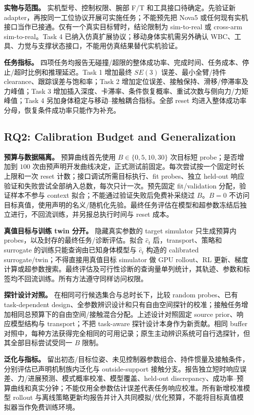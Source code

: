 \documentclass[11pt]{article}
\begin{document}
\textbf{实物与范围。} 实机型号、控制权限、腕部 F/T 和工具接口待确定。先验证新 adapter，再按同一工位协议开展可实施任务；不能预先把 Nova5 或任何现有实机接口当作已接通。仅有一个真实目标臂时，结论限制为 sim-to-real 或 cross-arm sim-to-real。Task 4 已纳入仿真扩展协议；移动身体实机需另外确认 WBC、工具、力觉与支撑状态接口，不能用仿真结果替代实机验证。

\textbf{任务指标。} 四项任务均报告无碰撞/超限的整体成功率、完成时间、任务成本、停止/超时比例和推理延迟。Task 1 增加最终 $SE(3)$ 误差、最小全臂/持件 clearance、跟踪误差与饱和率；Task 2 增加定位误差、接触保持、滑移/停滞率及力峰值；Task 3 增加插入深度、卡滞率、条件恢复概率、重试次数与侧向力/力矩峰值；Task 4 另加身体稳定与移动--接触耦合指标。全部 reset 均进入整体成功率分母，恢复条件成功率只能作为补充。

\subsection{RQ2: Calibration Budget and Generalization}
\textbf{预算与数据隔离。} 预算曲线首先使用 $B\in\{0,5,10,30\}$ 次目标短 probe；是否增加到 $100$ 次由预声明开发曲线决定，正式测试前固定。每次尝试按一个固定时长上限和一次 reset 计数；接口调试所需目标执行、fit probes、独立 held-out 响应验证和失败尝试全部纳入总数，每次只计一次。预先固定 fit/validation 分配，验证样本不参与 context 拟合；不能通过验证失败后免费补采绕过 $B$。$B=0$ 不访问目标真值，使用声明的名义/随机化先验。最终任务评估在模型和超参数冻结后独立进行，不回流训练，并另报总执行时间与 reset 成本。

\textbf{真值目标与训练 twin 分开。} 隐藏真实参数的 target simulator 只生成预算内 probes，以及封存的最终任务/诊断评估。拟合 $\hat c_t$ 后，transport、策略和 surrogate 的训练只能查询由已知身体模型与 $\hat c_t$ 构造的 calibrated surrogate/twin；不得直接用真值目标 simulator 做 GPU rollout、RL 更新、梯度计算或超参数搜索。最终评估及可行性诊断的查询量单列统计，其轨迹、参数和标签均不回流训练。所有方法遵守同样访问权限。

\textbf{探针设计对照。} 在相同可行候选集合与总时长下，比较 random probes、已有 task-dependent design、全参数辨识设计和只有自由空间探针的校准；接触任务增加相同总预算下的自由空间/接触混合分配。上述设计对照固定 source prior、响应模型结构与 transport；不把 task-aware 探针设计本身作为新贡献。相同 buffer 对照中，每种方法获得完全相同的可用记录；原生主动辨识系统可自行选探针，但其全部目标尝试受同一 $B$ 限制。

\textbf{泛化与指标。} 留出初态/目标位姿、未见控制器参数组合、持件惯量及接触条件，分别评估已声明机制族内泛化与 outside-support 接触分支。报告独立短时响应误差、力/进展预测、模式概率校准、模型覆盖、held-out discrepancy、成功率--预算曲线和真实分钟；不能仅用全参数估计误差代表任务响应校准。所有新增校准模型 rollout 与离线策略更新均报告并计入共同模拟/优化预算，不能将目标真值模拟器当作免费训练环境。
\end{document}
